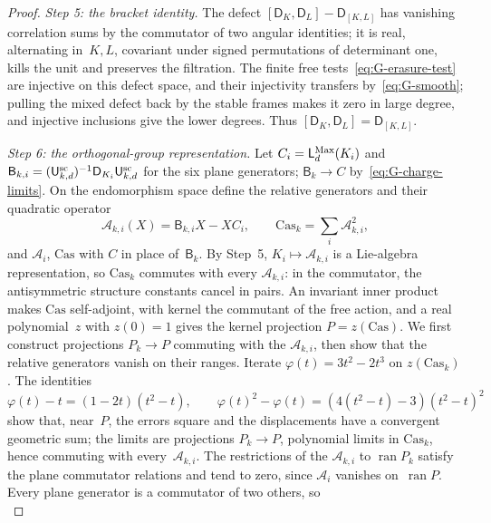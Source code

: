 \begin{proof}
\emph{Step 5: the bracket identity.} The defect $[\mathsf D_K,\mathsf D_L]-\mathsf D_{[K,L]}$ has vanishing correlation sums by the commutator of two angular identities; it is real, alternating in~$K,L$, covariant under signed permutations of determinant one, kills the unit and preserves the filtration. The finite free tests~\eqref{eq:G-erasure-test} are injective on this defect space, and their injectivity transfers by~\eqref{eq:G-smooth}; pulling the mixed defect back by the stable frames makes it zero in large degree, and injective inclusions give the lower degrees. Thus $[\mathsf D_K,\mathsf D_L]=\mathsf D_{[K,L]}$.

\emph{Step 6: the orthogonal-group representation.} Let $C_i=\mathsf L_d^{\rm Max}(K_i)$ and $\mathsf B_{k,i}=(\mathsf{U}_{k,d}^{\mathrm{sc}})^{-1}\mathsf D_{K_i}\mathsf{U}_{k,d}^{\mathrm{sc}}$ for the six plane generators; $\mathsf B_k\to C$ by~\eqref{eq:G-charge-limits}. On the endomorphism space define the relative generators and their quadratic operator
\begin{equation*}
\mathcal A_{k,i}(X)=\mathsf B_{k,i}X-XC_i,\qquad \mathrm{Cas}_k=\sum_i\mathcal A_{k,i}^2,
\end{equation*}
and $\mathcal A_i$, $\mathrm{Cas}$ with $C$ in place of~$\mathsf B_k$. By Step~5, $K_i\mapsto\mathcal A_{k,i}$ is a Lie-algebra representation, so $\mathrm{Cas}_k$ commutes with every $\mathcal A_{k,i}$: in the commutator, the antisymmetric structure constants cancel in pairs. An invariant inner product makes $\mathrm{Cas}$ self-adjoint, with kernel the commutant of the free action, and a real polynomial~$z$ with $z(0)=1$ gives the kernel projection $P=z(\mathrm{Cas})$. We first construct projections $P_k\to P$ commuting with the $\mathcal A_{k,i}$, then show that the relative generators vanish on their ranges. Iterate $\varphi(t)=3t^2-2t^3$ on $z(\mathrm{Cas}_k)$. The identities
\begin{equation*}
\varphi(t)-t=(1-2t)(t^2-t),\qquad
\varphi(t)^2-\varphi(t)=(4(t^2-t)-3)(t^2-t)^2
\end{equation*}
show that, near~$P$, the errors square and the displacements have a convergent geometric sum; the limits are projections $P_k\to P$, polynomial limits in $\mathrm{Cas}_k$, hence commuting with every~$\mathcal A_{k,i}$. The restrictions of the $\mathcal A_{k,i}$ to $\operatorname{ran}P_k$ satisfy the plane commutator relations and tend to zero, since $\mathcal A_i$ vanishes on~$\operatorname{ran}P$. Every plane generator is a commutator of two others, so
\begin{equation*}

\end{equation*}
\end{proof}
